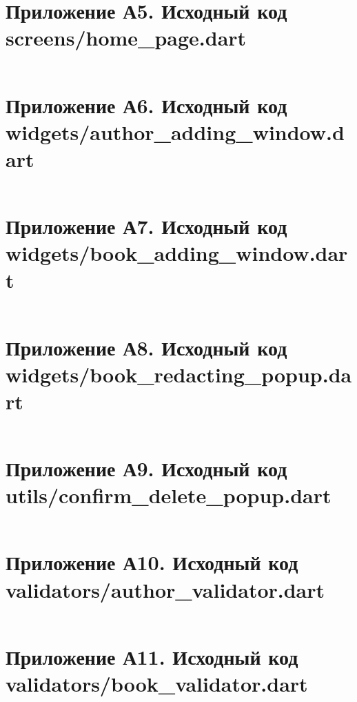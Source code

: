 \documentclass[oneside,a4paper,14pt]{extarticle}
\begin{document}
\section*{Приложение А5. Исходный код screens/home\_page.dart}
\inputminted{dart}{code/lib/screens/home_page.dart}

\newpage

\section*{Приложение А6. Исходный код widgets/author\_adding\_window.dart}
\inputminted{dart}{code/lib/widgets/author_adding_window.dart}

\newpage

\section*{Приложение А7. Исходный код widgets/book\_adding\_window.dart}
\inputminted{dart}{code/lib/widgets/book_adding_window.dart}

\newpage

\section*{Приложение А8. Исходный код widgets/book\_redacting\_popup.dart}
\inputminted{dart}{code/lib/widgets/book_redacting_popup.dart}

\newpage

\section*{Приложение А9. Исходный код utils/confirm\_delete\_popup.dart}
\inputminted{dart}{code/lib/utils/confirm_delete_popup.dart}

\newpage

\section*{Приложение А10. Исходный код validators/author\_validator.dart}
\inputminted[]{dart}{code/lib/validators/author_validator.dart}

\newpage

\section*{Приложение А11. Исходный код validators/book\_validator.dart}
\inputminted{dart}{code/lib/validators/book_validator.dart}
\end{document}
